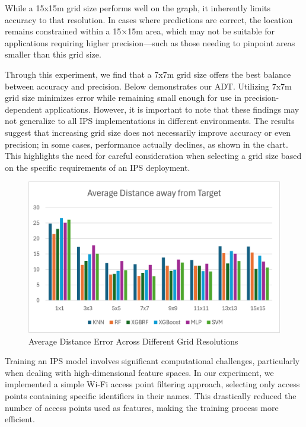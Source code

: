 \documentclass[runningheads]{llncs}
\begin{document}
While a 15x15m grid size performs well on the graph, it inherently limits accuracy to that resolution. In cases where predictions are correct, the location remains constrained within a 15×15m area, which may not be suitable for applications requiring higher precision—such as those needing to pinpoint areas smaller than this grid size.

Through this experiment, we find that a 7x7m grid size offers the best balance between accuracy and precision. Below demonstrates our ADT. Utilizing 7x7m grid size minimizes error while remaining small enough for use in precision-dependent applications. However, it is important to note that these findings may not generalize to all IPS implementations in different environments. The results suggest that increasing grid size does not necessarily improve accuracy or even precision; in some cases, performance actually declines, as shown in the chart. This highlights the need for careful consideration when selecting a grid size based on the specific requirements of an IPS deployment.



\vspace{-10pt}

\begin{figure}[htbp]
	\centerline{\includegraphics[scale=0.65]{image2.png}}
	\caption{Average Distance Error Across Different Grid Resolutions}
	\label{fig:Avg_dis_err}
\end{figure}



Training an IPS model involves significant computational challenges, particularly when dealing with high-dimensional feature spaces. In our experiment, we implemented a simple Wi-Fi access point filtering approach, selecting only access points containing specific identifiers in their names. This drastically reduced the number of access points used as features, making the training process more efficient.
\end{document}
